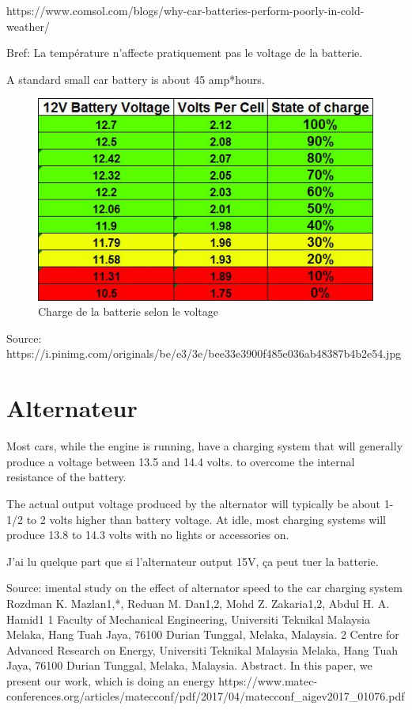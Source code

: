 \documentclass{article}
\begin{document}
https://www.comsol.com/blogs/why-car-batteries-perform-poorly-in-cold-weather/

Bref: La température n'affecte pratiquement pas le voltage de la batterie.

A standard small car battery is about 45 amp*hours.

\begin{figure}[h]
    \centering
    \includegraphics[scale=0.5]{figureVoltageBatterie.jpg}
    \caption{Charge de la batterie selon le voltage}
    \label{fig:my_label}
\end{figure}
Source: https://i.pinimg.com/originals/be/e3/3e/bee33e3900f485e036ab48387b4b2e54.jpg

\section{Alternateur}

Most cars, while the engine is running, have a charging system that will generally
produce a voltage between 13.5 and 14.4 volts.  to overcome the internal resistance of the
battery.

The actual output voltage produced by the alternator
will typically be about 1-1/2 to 2 volts higher than battery voltage. At idle, most charging
systems will produce 13.8 to 14.3 volts with no lights or accessories on. 

J'ai lu quelque part que si l'alternateur output 15V, ça peut tuer la batterie.

Source: imental study on the effect of alternator
speed to the car charging system
Rozdman K. Mazlan1,*, Reduan M. Dan1,2, Mohd Z. Zakaria1,2, Abdul H. A. Hamid1
1
Faculty of Mechanical Engineering, Universiti Teknikal Malaysia Melaka, Hang Tuah Jaya, 76100
Durian Tunggal, Melaka, Malaysia.
2
Centre for Advanced Research on Energy, Universiti Teknikal Malaysia Melaka, Hang Tuah Jaya,
76100 Durian Tunggal, Melaka, Malaysia.
Abstract. In this paper, we present our work, which is doing an energy 
https://www.matec-conferences.org/articles/matecconf/pdf/2017/04/matecconf_aigev2017_01076.pdf
\end{document}
